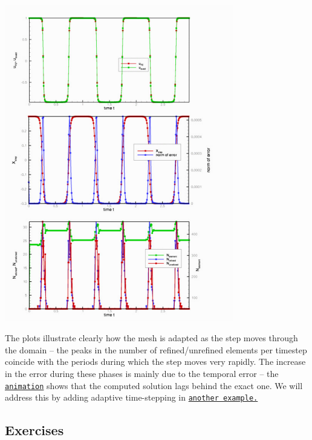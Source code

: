  
\begin{DoxyImage}
\includegraphics[width=0.75\textwidth]{trace}
\end{DoxyImage}


The plots illustrate clearly how the mesh is adapted as the step moves through the domain -- the peaks in the number of refined/unrefined elements per timestep coincide with the periods during which the step moves very rapidly. The increase in the error during these phases is mainly due to the temporal error -- the \href{../figures/step_soln.avi}{\tt animation} shows that the computed solution lags behind the exact one. We will address this by adding adaptive time-\/stepping in \href{../../two_d_unsteady_heat_2adapt/html/index.html}{\tt another example.}\hypertarget{index_ex}{}\subsection{Exercises}\label{index_ex}

